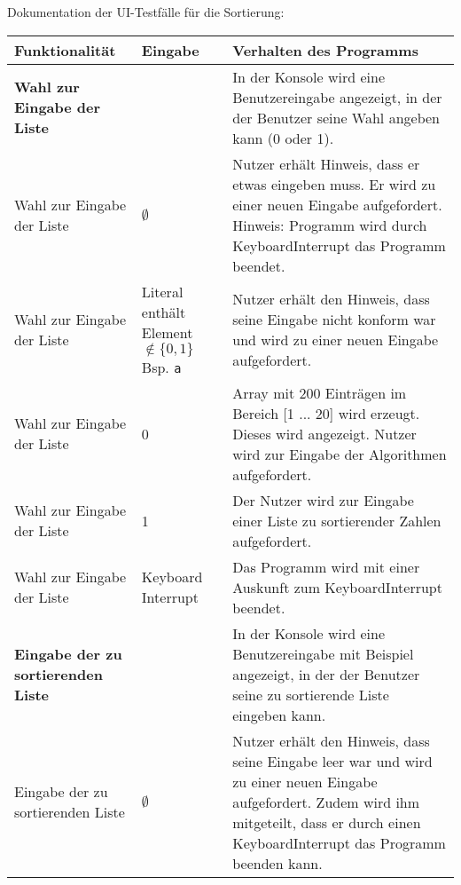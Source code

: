 \documentclass[a4paper]{article}
\begin{document}
\begin{exercise}{1}

Dokumentation der UI-Testf\"alle f\"ur die Sortierung:

\begin{center}	
	\begin{tabular}{| p{2.5cm} | p{3.2cm} | p{9cm} |}
		\hline
		Funktionalit\"at & Eingabe & Verhalten des Programms\\ \hline \hline
		
		\textbf{Wahl zur Eingabe der Liste} & 
		& In der Konsole wird eine Benutzereingabe angezeigt, in der der Benutzer seine Wahl
		angeben kann (0 oder 1). \\ \hline
		
		Wahl zur Eingabe der Liste & $\emptyset$
		& Nutzer erh\"alt Hinweis, dass er etwas eingeben muss. Er wird zu einer neuen Eingabe
		aufgefordert. Hinweis: Programm wird durch KeyboardInterrupt das Programm beendet. \\ \hline
		
		Wahl zur Eingabe der Liste & Literal enth\"alt Element $\notin \{0, 1\}$ \newline Bsp. \texttt{a}
		& Nutzer erh\"alt den Hinweis, dass seine Eingabe nicht konform war und wird zu einer
		neuen Eingabe aufgefordert.\\ \hline
		
		Wahl zur Eingabe der Liste & 0
		& Array mit 200 Eintr\"agen im Bereich [1 ... 20] wird erzeugt. Dieses wird angezeigt.
		Nutzer wird zur Eingabe der Algorithmen aufgefordert.\\ \hline
		
		Wahl zur Eingabe der Liste & 1
		& Der Nutzer wird zur Eingabe einer Liste zu sortierender Zahlen aufgefordert.\\ \hline
		
		Wahl zur Eingabe der Liste & Keyboard Interrupt
		& Das Programm wird mit einer Auskunft zum KeyboardInterrupt beendet.\\ \hline
		
		\textbf{Eingabe der zu sortierenden Liste} & 
		& In der Konsole wird eine Benutzereingabe mit Beispiel angezeigt, in der der Benutzer
		seine zu sortierende Liste eingeben kann. \\ \hline
		
		Eingabe der zu sortierenden Liste & $\emptyset$
		& Nutzer erh\"alt den Hinweis, dass seine Eingabe leer war und wird zu einer neuen Eingabe
		aufgefordert. Zudem wird ihm mitgeteilt, dass er durch einen KeyboardInterrupt das Programm
		beenden kann. \\ \hline
		

\end{tabular}
\end{center}
\end{exercise}
\end{document}
